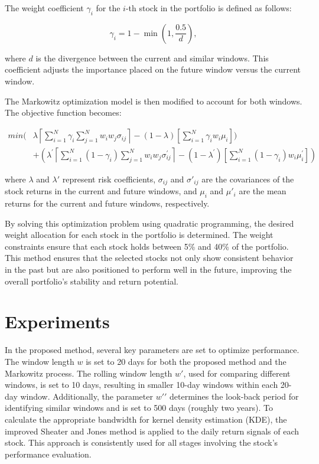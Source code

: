 \documentclass[preprint,12pt,authoryear]{elsarticle}
\begin{document}
The weight coefficient \( \gamma_i \) for the \( i \)-th stock in the portfolio is defined as follows:

\begin{equation}\label{gamma}
    \gamma_i = 1 - \min\left(1, \frac{0.5}{d}\right),
\end{equation}

where \( d \) is the divergence between the current and similar windows. This coefficient adjusts the importance placed on the future window versus the current window.

The Markowitz optimization model is then modified to account for both windows. The objective function becomes:


\begin{equation}\label{min}
\begin{split}
    min(& \lambda \left\lceil \sum_{i=1}^{N} \gamma_i \sum_{j=1}^{N}w_i w_j\sigma_{ij} \right\rceil
    -(1-\lambda) \left[ \sum_{i=1}^{N}\gamma_i w_i \mu_i \right]) \\ & + (\lambda^{\prime} \left\lceil \sum_{i=1}^{N} (1-\gamma_i) \sum_{j=1}^{N}w_i w_j \sigma^{\prime}_{ij} \right\rceil - (1-\lambda^{\prime}) \left[ \sum_{i=1}^{N}(1-\gamma_i) w_i \mu^{\prime}_i \right])
\end{split}
\end{equation}

where \( \lambda \) and \( \lambda' \) represent risk coefficients, \( \sigma_{ij} \) and \( \sigma'_{ij} \) are the covariances of the stock returns in the current and future windows, and \( \mu_i \) and \( \mu'_i \) are the mean returns for the current and future windows, respectively.

By solving this optimization problem using quadratic programming, the desired weight allocation for each stock in the portfolio is determined. The weight constraints ensure that each stock holds between 5\% and 40\% of the portfolio. This method ensures that the selected stocks not only show consistent behavior in the past but are also positioned to perform well in the future, improving the overall portfolio's stability and return potential.




\section{Experiments}\label{sec:Experiments}
In the proposed method, several key parameters are set to optimize performance. The window length \(w\) is set to 20 days for both the proposed method and the Markowitz process. The rolling window length \(w′\), used for comparing different windows, is set to 10 days, resulting in smaller 10-day windows within each 20-day window. Additionally, the parameter \(w′′\) determines the look-back period for identifying similar windows and is set to 500 days (roughly two years). To calculate the appropriate bandwidth for kernel density estimation (KDE), the improved Sheater and Jones method is applied to the daily return signals of each stock. This approach is consistently used for all stages involving the stock’s performance evaluation.
\end{document}
